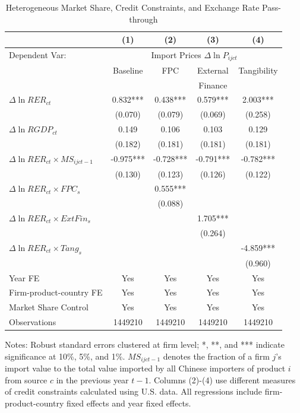 \begin{table}[H]
	\centering
	\caption{Heterogeneous Market Share, Credit Constraints, and Exchange Rate Pass-through}
        \setlength{\tabcolsep}{3mm}
	\begin{threeparttable}
		\begin{tabular}{lcccc}
			\toprule
			& (1)   & (2)   & (3)   & (4) \\
			\midrule
                Dependent Var: & \multicolumn{4}{c}{ Import Prices $\Delta \ln P_{ijct}$} \\
			&  Baseline     & FPC & External & Tangibility        \\
                &    &  & Finance &        \\
			\midrule
			$\Delta \ln RER_{ct}$ & 0.832*** & 0.438*** & 0.579*** & 2.003*** \\
			& (0.070) & (0.079) & (0.069) & (0.258) \\
			$\Delta \ln RGDP_{ct}$ & 0.149 & 0.106 & 0.103 & 0.129 \\
			& (0.182) & (0.181) & (0.181) & (0.181) \\
                $\Delta \ln RER_{ct} \times MS_{ijct-1}$ & -0.975*** & -0.728*** & -0.791*** & -0.782*** \\
			&  (0.130) & (0.123) & (0.126) & (0.122) \\
			$\Delta \ln RER_{ct} \times FPC_{s}$ &  & 0.555*** &       &  \\
			&  & (0.088) &       &  \\
			$\Delta \ln RER_{ct} \times ExtFin_{s}$ &   &       & 1.705*** &  \\
			&  &       & (0.264) &  \\
			$\Delta \ln RER_{ct} \times Tang_{s}$ &   &       &       & -4.859*** \\
			&   &       &       & (0.960) \\
                \midrule
			Year FE  & Yes  & Yes   & Yes   & Yes \\
			Firm-product-country FE & Yes    & Yes   & Yes   & Yes \\
			Market Share Control & Yes   & Yes   & Yes   & Yes \\
			Observations & 1449210  & 1449210 & 1449210 & 1449210 \\
			\bottomrule
		\end{tabular}
		\begin{tablenotes}
			\footnotesize
			\item Notes: Robust standard errors clustered at firm level; *, **, and *** indicate significance at 10\%, 5\%, and 1\%. $MS_{ijct-1}$ denotes the fraction of a firm $j$'s import value to the total value imported by all Chinese importers of product $i$ from source $c$ in the previous year $t-1$. Columns (2)-(4) use different measures of credit constraints calculated using U.S. data. All regressions include firm-product-country fixed effects and year fixed effects.
		\end{tablenotes}
	\end{threeparttable}
	\label{tab.share}
\end{table}

